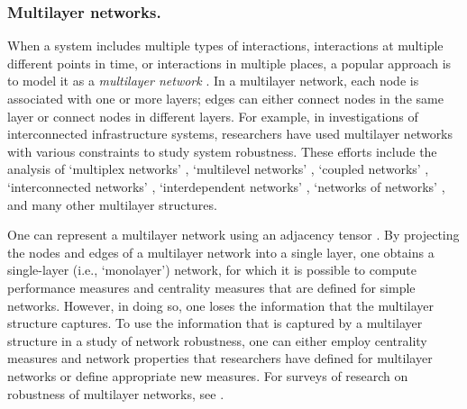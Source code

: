 \documentclass{comnet-mod}
\begin{document}
\subsubsection{Multilayer networks.}\label{sec:multilayer_networks}

When a system includes multiple types of interactions, interactions at multiple different points in time, or interactions in multiple places, a popular approach is to model it as a \textit{multilayer network} \cite{Kivela2014, Porter2018, dedomenico2022, dedomenico2023}. In a multilayer network, each node is associated with one or more layers; edges can either connect nodes in the same layer or connect nodes in different layers. For example, in investigations of interconnected infrastructure systems, researchers have used multilayer networks with various constraints to study system robustness. These efforts include the analysis of {`multiplex networks'} \cite{Baggio2016, Bianconi2016, Hackett2016, Zhao2016, Kazawa2017, Osat2017, Radicchi2017, Kazawa2018, Kazawa2020}, {`multilevel networks'} \cite{Cetinkaya2013, Cetinkaya2015, Lordan2017}, {`coupled networks'} \cite{Schneider2013, Wang2013, Gong2015, Liu2016b, Wang2016}, {`interconnected networks'} \cite{Siami2013, Siami2013a, Tan2013, Siami2014, Zhang2015a, Zhao2015, Garas2016, Xia2016, Zhang2016, Zhu2016, Murakami2017}, {`interdependent networks'} \cite{Buldyrev2010, Huang2011, Gao2012, Zhou2012, Dong2013a, Huang2013a, Parandehgheibi2013, Zhang2013a, Wang2014c, Watanabe2014, Chattopadhyay2015, Shahrivar2015, Tan2015, Ji2016, Liu2016a, Chattopadhyay2017, Chen2017, Rueda2017, Cui2018, Gao2018, Wang2018a, Kazawa2020}, {`networks of networks'} \cite{Dong2013, Bianconi2014, Shekhtman2014, Gao2015, Khoury2015, Danziger2016, Shekhtman2016, Roth2017, Shekhtman2018}, and many other multilayer structures. 

One can represent a multilayer network using an adjacency tensor \cite{Kivela2014}. By projecting the nodes and edges of a multilayer network into a single layer, one obtains a single-layer (i.e., `monolayer') network, for which it is possible to compute performance measures and centrality measures that are defined for simple networks. However, in doing so, one loses the information that the multilayer structure captures. To use the information that is captured by a multilayer structure in a study of network robustness, one can either employ centrality measures and network properties that researchers have defined for multilayer networks \cite{Erlebach2006, deDomenico2013, Klimm2014, Basaras2017, Zhang2017, Estrada2019, Sole-Ribalta2016} or define appropriate new measures. For surveys of research on robustness of multilayer networks, see \cite{Bachmann2020, Mahabadi2023}.
\end{document}
